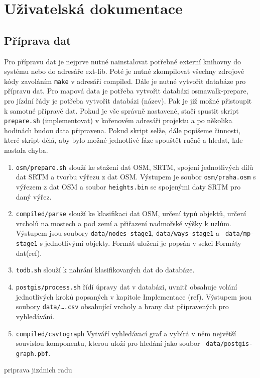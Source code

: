 \chapter{Uživatelská dokumentace}
\section{Příprava dat}
Pro přípravu dat je nejprve nutné nainstalovat potřebné externí knihovny do
systému nebo do adresáře ext-lib. Poté je nutné zkompilovat všechny zdrojové
kódy zavoláním {\tt make} v adresáři compiled. Dále je nutné vytvořit databáze
pro přípravu dat. Pro mapová data je potřeba vytvořit databázi osmawalk-prepare,
pro jízdní řády je potřeba vytvořit databázi (\TODO název). Pak je již možné
přistoupit k samotné přípravě dat. Pokud je vše správně nastavené, stačí spustit
skript {\tt prepare.sh} (\TODO implementovat) v kořenovém adresáři projektu a po několika hodinách
budou data připravena. Pokud skript selže, dále popíšeme činnosti, které skript
dělá, aby bylo možné jednotlivé fáze spouštět ručně a hledat, kde nastala chyba.

\begin{enumerate}
\item {\tt osm/prepare.sh} slouží ke stažení dat OSM, SRTM, spojení jednotlivých
dílů dat SRTM a tvorbu výřezu z dat OSM. Výstupem je soubor {\tt osm/praha.osm}
s výřezem z dat OSM a soubor {\tt heights.bin} se spojenými daty SRTM pro daný
výřez. 
\item {\tt compiled/parse} slouží ke klasifikaci dat OSM, určení typů objektů,
určení vrcholů na mostech a pod zemí a přiřazení nadmořské výšky k uzlům.
Výstupem jsou soubory {\tt data/nodes-stage1}, {\tt data/ways-stage1} a {\tt
data/mp-stage1} s jednotlivými objekty. Formát uložení je popsán v sekci Formáty
dat(\TODO ref).
\item {\tt todb.sh} slouží k nahrání klasifikovaných dat do databáze. 
\item {\tt postgis/process.sh} řídí úpravy dat v databázi, uvnitř obsahuje
volání jednotlivých kroků popsaných v kapitole Implementace (\TODO ref).
Výstupem jsou soubory {\tt data/\dots.csv} obsahující vrcholy a hrany dat
připravených pro vyhledávání. 
\item {\tt compiled/csvtograph} Vytváří vyhledávací graf a vybírá v něm největší
souvislou komponentu, kterou uloží pro hledání jako soubor {\tt
data/postgis-graph.pbf}.
\end{enumerate}
\TODO priprava jizdnich radu

